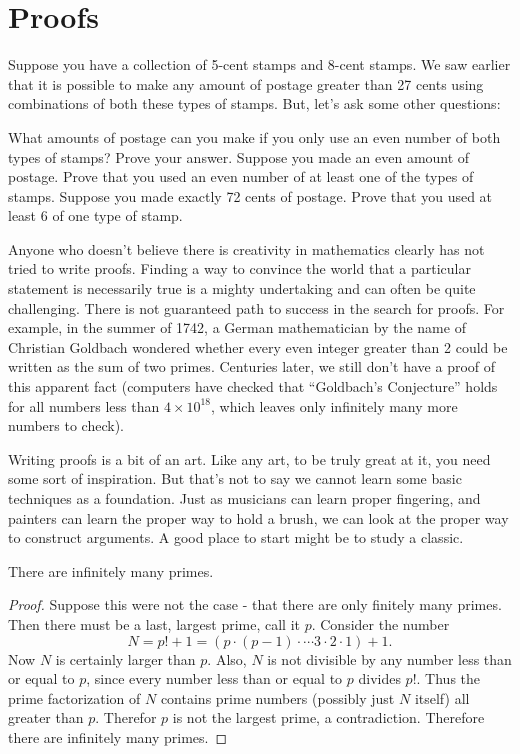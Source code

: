 \documentclass[12pt]{article}
\begin{document}
\section{Proofs}
\begin{activity}
Suppose you have a collection of 5-cent stamps and 8-cent stamps.  We saw earlier that it is possible to make any amount of postage greater than 27 cents using combinations of both these types of stamps.  But, let's ask some other questions:
\begin{questions}
\question What amounts of postage can you make if you only use an even number of both types of stamps? Prove your answer.
\vfill
\question Suppose you made an even amount of postage.  Prove that you used an even number of at least one of the types of stamps.
\vfill
\question Suppose you made exactly 72 cents of postage.  Prove that you used at least 6 of one type of stamp.
\vfill
\end{questions}

\end{activity}


Anyone who doesn't believe there is creativity in mathematics clearly has not tried to write proofs.  Finding a way to convince the world that a particular statement is necessarily true is a mighty undertaking and can often be quite challenging.  There is not guaranteed path to success in the search for proofs.  For example, in the summer of 1742, a German mathematician by the name of Christian Goldbach wondered whether every even integer greater than 2 could be written as the sum of two primes.  Centuries later, we still don't have a proof of this apparent fact (computers have checked that ``Goldbach's Conjecture'' holds for all numbers less than $4\times 10^{18}$, which leaves only infinitely many more numbers to check). 

Writing proofs is a bit of an art.  Like any art, to be truly great at it, you need some sort of inspiration.  But that's not to say we cannot learn some basic techniques as a foundation.  Just as musicians can learn proper fingering, and painters can learn the proper way to hold a brush, we can look at the proper way to construct arguments.  A good place to start might be to study a classic.


 \begin{theorem}
  There are infinitely many primes.
 \end{theorem}
 
 \begin{proof}
  Suppose this were not the case - that there are only finitely many primes.  Then there must be a last, largest prime, call it $p$. Consider the number 
  \[N = p! + 1 = (p \cdot (p-1) \cdot \cdots 3\cdot 2 \cdot 1) + 1.\]
  Now $N$ is certainly larger than $p$.  Also, $N$ is not divisible by any number less than or equal to $p$, since every number less than or equal to $p$ divides $p!$.  Thus the prime factorization of $N$ contains prime numbers (possibly just $N$ itself) all greater than $p$.  Therefor $p$ is not the largest prime, a contradiction.  Therefore there are infinitely many primes.
 \end{proof}
 
\end{document}
